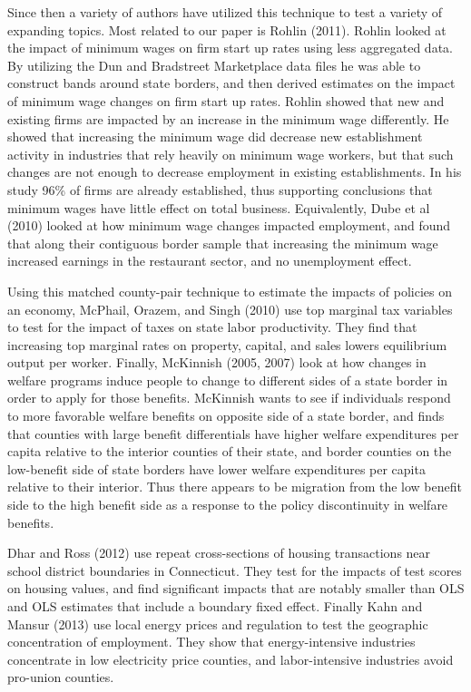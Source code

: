 Since then a variety of authors have utilized this technique to test a variety of expanding topics. Most related to our paper is Rohlin (2011). Rohlin looked at the impact of minimum wages on firm start up rates using less aggregated data. By utilizing the Dun and Bradstreet Marketplace data files he was able to construct bands around state borders, and then derived estimates on the impact of minimum wage changes on firm start up rates. Rohlin showed that new and existing firms are impacted by an increase in the minimum wage differently. He showed that increasing the minimum wage did decrease new establishment activity in industries that rely heavily on minimum wage workers, but that such changes are not enough to decrease employment in existing establishments. In his study 96\% of firms are already established, thus supporting conclusions that minimum wages have little effect on total business. Equivalently, Dube et al (2010) looked at how minimum wage changes impacted employment, and found that along their contiguous border sample that increasing the minimum wage increased earnings in the restaurant sector, and no unemployment effect. 

Using this matched county-pair technique to estimate the impacts of policies on an economy, McPhail, Orazem, and Singh (2010) use top marginal tax variables to test for the impact of taxes on state labor productivity. They find that increasing top marginal rates on property, capital, and sales lowers equilibrium output per worker. Finally, McKinnish (2005, 2007) look at how changes in welfare programs induce people to change to different sides of a state border in order to apply for those benefits. McKinnish wants to see if individuals respond to more favorable welfare benefits on opposite side of a state border, and finds that counties with large benefit differentials have higher welfare expenditures per capita relative to the interior counties of their state, and border counties on the low-benefit side of state borders have lower welfare expenditures per capita relative to their interior. Thus there appears to be migration from the low benefit side to the high benefit side as a response to the policy discontinuity in welfare benefits. 

Dhar and Ross (2012) use repeat cross-sections of housing transactions near school district boundaries in Connecticut. They test for the impacts of test scores on housing values, and find significant impacts that are notably smaller than OLS and OLS estimates that include a boundary fixed effect.  Finally Kahn and Mansur (2013) use local energy prices and regulation to test the geographic concentration of employment. They show that energy-intensive industries concentrate in low electricity price counties, and labor-intensive industries avoid pro-union counties.

